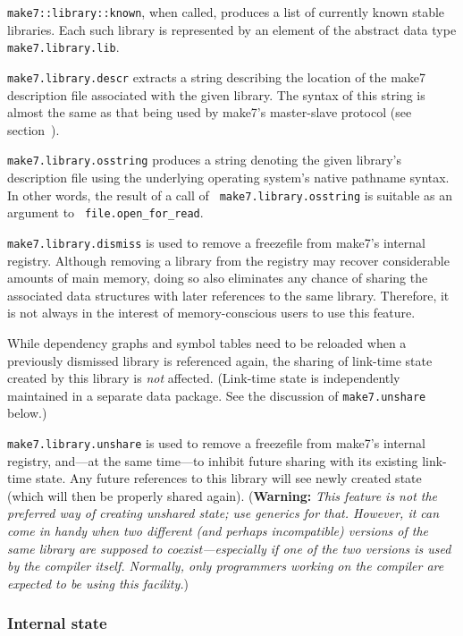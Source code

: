{\tt make7::library::known}, when called, produces a list of currently
known stable libraries.  Each such library is represented by an
element of the abstract data type {\tt make7.library.lib}.

{\tt make7.library.descr} extracts a string describing the location of
the make7 description file associated with the given library.  The syntax
of this string is almost the same as that being used by make7's
master-slave protocol (see section~).

{\tt make7.library.osstring} produces a string denoting the given
library's description file using the underlying operating system's
native pathname syntax.  In other words, the result of a call of {\tt
make7.library.osstring} is suitable as an argument to {\tt
file.open_for_read}.

{\tt make7.library.dismiss} is used to remove a freezefile from make7's
internal registry.  Although removing a library from the registry may
recover considerable amounts of main memory, doing so also eliminates
any chance of sharing the associated data structures with later
references to the same library.  Therefore, it is not always in the
interest of memory-conscious users to use this feature.

While dependency graphs and symbol tables need to be reloaded when a
previously dismissed library is referenced again, the sharing of
link-time state created by this library is {\em not} affected.
(Link-time state is independently maintained in a separate data
package.  See the discussion of {\tt make7.unshare} below.)

{\tt make7.library.unshare} is used to remove a freezefile from make7's
internal registry, and---at the same time---to inhibit future sharing
with its existing link-time state.  Any future references to this
library will see newly created state (which will then be properly
shared again).  ({\bf Warning:} {\it This feature is not the preferred
way of creating unshared state; use generics for that.  However, it
can come in handy when two different (and perhaps incompatible)
versions of the same library are supposed to coexist---especially if
one of the two versions is used by the compiler itself.  Normally, only
programmers working on the compiler are expected to be using this
facility.})

\subsubsection{Internal state}


